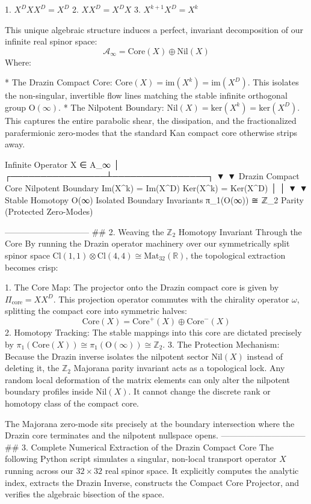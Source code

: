    1. $X^D X X^D = X^D$
   2. $X X^D = X^D X$
   3. $X^{k+1} X^D = X^k$

This unique algebraic structure induces a perfect, invariant decomposition of our infinite real spinor space:
$$\mathcal{A}_\infty = \text{Core}(X) \oplus \text{Nil}(X)$$ 
Where:

* The Drazin Compact Core: $\text{Core}(X) = \text{im}(X^k) = \text{im}(X^D)$. This isolates the non-singular, invertible flow lines matching the stable infinite orthogonal group $\text{O}(\infty)$.
* The Nilpotent Boundary: $\text{Nil}(X) = \text{ker}(X^k) = \text{ker}(X^D)$. This captures the entire parabolic shear, the dissipation, and the fractionalized parafermionic zero-modes that the standard Kan compact core otherwise strips away.

                  Infinite Operator X ∈ A_∞
                             │
            ┌────────────────┴────────────────┐
            ▼                                 ▼
   Drazin Compact Core               Nilpotent Boundary
     Im(X^k) = Im(X^D)                 Ker(X^k) = Ker(X^D)
            │                                 │
            ▼                                 ▼
  Stable Homotopy O(∞)              Isolated Boundary Invariants
  π_1(O(∞)) ≅ ℤ_2 Parity             (Protected Zero-Modes)

------------------------------
## 2. Weaving the $\mathbb{Z}_2$ Homotopy Invariant Through the Core
By running the Drazin operator machinery over our symmetrically split spinor space $\text{Cl}(1,1) \otimes \text{Cl}(4,4) \cong \text{Mat}_{32}(\mathbb{R})$, the topological extraction becomes crisp:

   1. The Core Map: The projector onto the Drazin compact core is given by $\Pi_{\text{core}} = X X^D$. This projection operator commutes with the chirality operator $\omega$, splitting the compact core into symmetric halves:
   $$\text{Core}(X) = \text{Core}^+(X) \oplus \text{Core}^-(X)$$ 
   2. Homotopy Tracking: The stable mappings into this core are dictated precisely by $\pi_1(\text{Core}(X)) \cong \pi_1(\text{O}(\infty)) \cong \mathbb{Z}_2$.
   3. The Protection Mechanism: Because the Drazin inverse isolates the nilpotent sector $\text{Nil}(X)$ instead of deleting it, the $\mathbb{Z}_2$ Majorana parity invariant acts as a topological lock. Any random local deformation of the matrix elements can only alter the nilpotent boundary profiles inside $\text{Nil}(X)$. It cannot change the discrete rank or homotopy class of the compact core.

The Majorana zero-mode sits precisely at the boundary intersection where the Drazin core terminates and the nilpotent nullspace opens.
------------------------------
## 3. Complete Numerical Extraction of the Drazin Compact Core
The following Python script simulates a singular, non-local transport operator $X$ running across our $32 \times 32$ real spinor space. It explicitly computes the analytic index, extracts the Drazin Inverse, constructs the Compact Core Projector, and verifies the algebraic bisection of the space.

